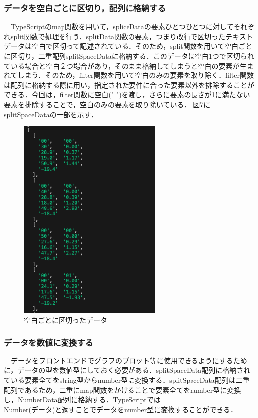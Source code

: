  \subsubsection{データを空白ごとに区切り，配列に格納する}
　TypeScriptのmap関数を用いて，spliceDataの要素ひとつひとつに対してそれぞれsplit関数で処理を行う．splitData関数の要素，つまり改行で区切ったテキストデータは空白で区切って記述されている．そのため，split関数を用いて空白ごとに区切り，二重配列splitSpaceDataに格納する．このデータは空白1つで区切られている場合と空白２つ場合があり，そのまま格納してしまうと空白の要素が生まれてしまう．そのため，filter関数を用いて空白のみの要素を取り除く．filter関数は配列に格納する際に用い，指定された要件に合った要素以外を排除することができる．今回は，filter関数に空白(" ")を渡し，さらに要素の長さが1に満たない要素を排除することで，空白のみの要素を取り除いている．
 図7にsplitSpaceDataの一部を示す．
 \begin{figure}[h]
   \centering
   \includegraphics[width=70mm]{fig/splitSpaceData.png}
   \caption{空白ごとに区切ったデータ}
 \end{figure}
 
 \subsubsection{データを数値に変換する}
 　データをフロントエンドでグラフのプロット等に使用できるようにするために，データの型を数値型にしておく必要がある．splitSpaceData配列に格納されている要素全てをstring型からnumber型に変換する．splitSpaceData配列は二重配列であるため，二重にmap関数をかけることで要素全てをnumber型に変換し，NumberData配列に格納する．TypeScriptでは\\Number(データ)と返すことでデータをnumber型に変換することができる．
 
